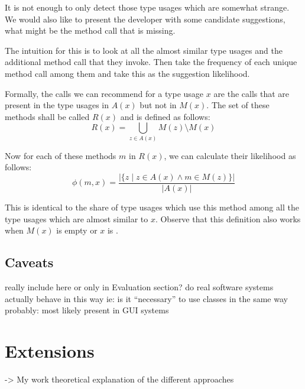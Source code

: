 It is not enough to only detect those type usages which are somewhat strange.
We would also like to present the developer with some candidate suggestions, what might be the method call that is missing.

The intuition for this is to look at all the almost similar type usages and the additional method call that they invoke.
Then take the frequency of each unique method call among them and take this as the suggestion likelihood.


Formally, the calls we can recommend for a type usage $x$ are the calls that are present in the type usages in $A(x)$ but not in $M(x)$.
The set of these methods shall be called $R(x)$ and is defined as follows:
\begin{equation*}
    R(x) = \bigcup_{z \in A(x)} M(z) \setminus M(x)
\end{equation*}

Now for each of these methods $m$ in $R(x)$, we can calculate their likelihood as follows:
\begin{equation*}
    \phi(m, x) = \frac{|\{z \mid z \in A(x) \land m \in M(z)\}|}{|A(x)|}
\end{equation*}

This is identical to the share of type usages which use this method among all the type usages which are almost similar to $x$.
Observe that this definition also works when $M(x)$ is empty or $x$ is .


\subsection{Caveats}
really include here or only in Evaluation section?
do real software systems actually behave in this way
ie: is it ``necessary'' to use classes in the same way
probably: most likely present in GUI systems

\section{Extensions}
-> My work
theoretical explanation of the different approaches

